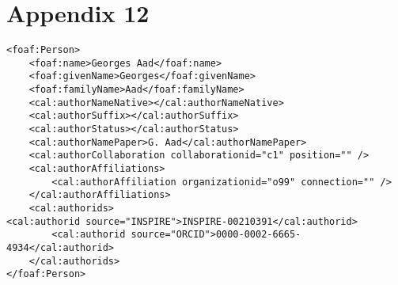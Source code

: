 \section*{Appendix 12}
\label{sec:app12}

\begin{lstlisting}
<foaf:Person>
    <foaf:name>Georges Aad</foaf:name>
    <foaf:givenName>Georges</foaf:givenName>
    <foaf:familyName>Aad</foaf:familyName>
    <cal:authorNameNative></cal:authorNameNative>
    <cal:authorSuffix></cal:authorSuffix>
    <cal:authorStatus></cal:authorStatus>
    <cal:authorNamePaper>G. Aad</cal:authorNamePaper>
    <cal:authorCollaboration collaborationid="c1" position="" />
    <cal:authorAffiliations>
        <cal:authorAffiliation organizationid="o99" connection="" />
    </cal:authorAffiliations>
    <cal:authorids>
<cal:authorid source="INSPIRE">INSPIRE-00210391</cal:authorid>
        <cal:authorid source="ORCID">0000-0002-6665-4934</cal:authorid>
    </cal:authorids>
</foaf:Person>

\end{lstlisting}
